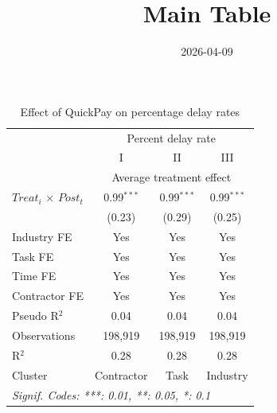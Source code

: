 \documentclass[
]{article}
\title{Main Table}
\author{}
\date{\vspace{-2.5em}2026-04-09}
\begin{document}
\maketitle

\begin{table}[htbp]
   \caption{Effect of QuickPay on percentage delay rates}
   \centering
   \small
   \begin{tabular}{lccc}
      \toprule
       & \multicolumn{3}{c}{Percent delay rate}\\
                                   & I            & II           & III\\  
       & \multicolumn{3}{c}{Average treatment effect} \\ 
      \midrule 
      $Treat_i$ $\times$ $Post_t$  & 0.99$^{***}$ & 0.99$^{***}$ & 0.99$^{***}$\\   
                                   & (0.23)       & (0.29)       & (0.25)\\   
      \midrule 
      Industry FE                  & Yes          & Yes          & Yes\\  
      Task FE                      & Yes          & Yes          & Yes\\  
      Time FE                      & Yes          & Yes          & Yes\\  
      Contractor FE                & Yes          & Yes          & Yes\\  
      Pseudo R$^2$                 & 0.04         & 0.04         & 0.04\\  
      Observations                 & 198,919      & 198,919      & 198,919\\  
      R$^2$                        & 0.28         & 0.28         & 0.28\\  
      Cluster                      & Contractor   & Task         & Industry\\  
      \midrule
      \multicolumn{4}{l}{\emph{Signif. Codes: ***: 0.01, **: 0.05, *: 0.1}}\\
   \end{tabular}
\end{table}
\end{document}
